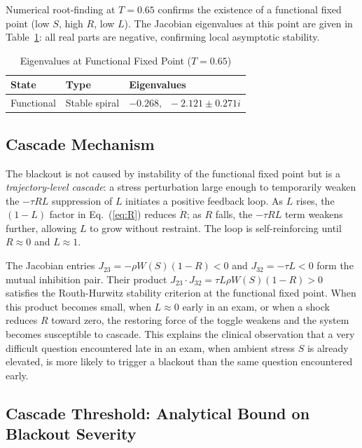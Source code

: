 Numerical root-finding at $T=0.65$ confirms the existence of a
functional fixed point (low $S$, high $R$, low $L$). The Jacobian
eigenvalues at this point are given in Table~\ref{tab:eigenvalues}:
all real parts are negative, confirming local asymptotic stability.

\begin{table}[h]
\caption{Eigenvalues at Functional Fixed Point ($T=0.65$)}
\label{tab:eigenvalues}
\centering
\renewcommand{\arraystretch}{1.25}
\begin{tabular}{lll}
\toprule
\textbf{State} & \textbf{Type} & \textbf{Eigenvalues} \\
\midrule
Functional & Stable spiral & $-0.268,\;\; -2.121 \pm 0.271i$ \\
\bottomrule
\end{tabular}
\end{table}

\subsection{Cascade Mechanism}

The blackout is not caused by instability of the functional fixed
point but is a \emph{trajectory-level cascade}: a stress
perturbation large enough to temporarily weaken the $-\tau RL$
suppression of $L$ initiates a positive feedback loop. As $L$
rises, the $(1-L)$ factor in Eq.~(\ref{eq:R}) reduces $\dot{R}$;
as $R$ falls, the $-\tau RL$ term weakens further, allowing $L$
to grow without restraint. The loop is self-reinforcing until
$R\approx 0$ and $L\approx 1$.

The Jacobian entries $J_{23}=-\rho W(S)(1-R)<0$ and
$J_{32}=-\tau L<0$ form the mutual inhibition pair. Their product
$J_{23}\cdot J_{32}=\tau L\rho W(S)(1-R)>0$ satisfies the
Routh-Hurwitz stability criterion at the functional fixed point.
When this product becomes small, when $L\approx 0$ early in
an exam, or when a shock reduces $R$ toward zero, the restoring
force of the toggle weakens and the system becomes susceptible to
cascade. This explains the clinical observation that a very
difficult question encountered late in an exam, when ambient
stress $S$ is already elevated, is more likely to trigger a
blackout than the same question encountered early.

\subsection{Cascade Threshold: Analytical Bound on Blackout Severity}

